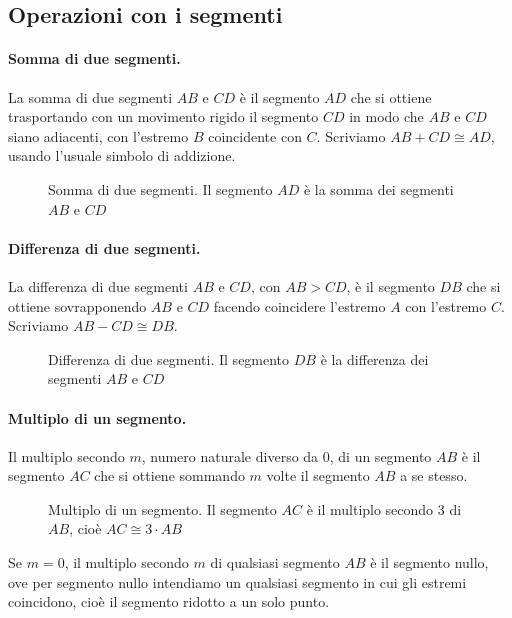 \subsection{Operazioni con i segmenti}

\paragraph{Somma di due segmenti.} La somma di due segmenti $AB$ e $CD$ è il segmento $AD$ che si ottiene trasportando con un movimento rigido il segmento $CD$ in modo che $AB$ e $CD$ siano adiacenti, con l'estremo $B$ coincidente con $C$. Scriviamo $AB + CD \cong AD$, usando l'usuale simbolo di addizione.

\begin{figure}[htb]
\centering
\caption{Somma di due segmenti. Il segmento $AD$ è la somma dei segmenti $AB$ e $CD$}
\end{figure}

\paragraph{Differenza di due segmenti.} La differenza di due segmenti $AB$ e $CD$, con $AB>CD$, è il segmento $DB$ che si ottiene sovrapponendo $AB$ e $CD$ facendo coincidere l'estremo $A$ con l'estremo $C$. Scriviamo $AB-CD \cong DB$.

\begin{figure}[htb]
\centering
\caption{Differenza di due segmenti. Il segmento $DB$ è la differenza dei segmenti $AB$ e $CD$}
\end{figure}

\paragraph{Multiplo di un segmento.} Il multiplo secondo $m$, numero naturale diverso da 0, di un segmento $AB$ è il segmento $AC$ che si ottiene sommando $m$ volte il segmento $AB$ a se stesso.

\begin{figure}[htb]
\centering
\caption{Multiplo di un segmento. Il segmento $AC$ è il multiplo secondo 3 di $AB$, cioè $AC\cong 3\cdot AB$}
\end{figure}

Se $m=0$, il multiplo secondo $m$ di qualsiasi segmento $AB$ è il segmento nullo, ove per segmento nullo intendiamo un qualsiasi segmento in cui gli estremi coincidono, cioè il segmento ridotto a un solo punto.

